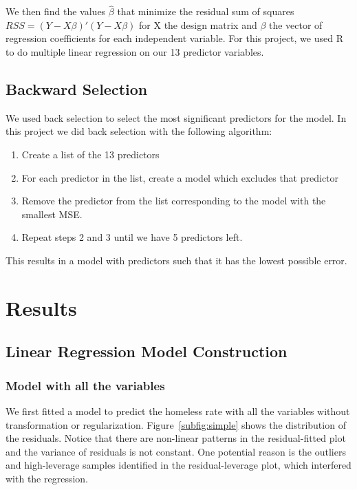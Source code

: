 \documentclass[12pt]{article}
\begin{document}
We then find the values $\hat{\beta}$ that minimize the residual sum of squares $RSS = (Y-X\beta)'(Y-X\beta)$ for X the design matrix and $\beta$ the vector of regression coefficients for each independent variable. For this project, we used R to do multiple linear regression on our 13 predictor variables.

\subsection{Backward Selection\cite{james_2023_an}}

We used back selection to select the most significant predictors for the model. In this project we did back selection with the following algorithm:
\begin{enumerate}
    \item Create a list of the 13 predictors
    \item For each predictor in the list, create a model which excludes that predictor
    \item Remove the predictor from the list corresponding to the model with the smallest MSE.
    \item Repeat steps 2 and 3 until we have 5 predictors left.
\end{enumerate}
This results in a model with predictors such that it has the lowest possible error.


\section{Results}
\subsection{Linear Regression Model Construction}

\subsubsection{Model with all the variables}
We first fitted a model to predict the homeless rate with all the variables without transformation or regularization. Figure~\ref{subfig:simple} shows the distribution of the residuals. Notice that there are non-linear patterns in the residual-fitted plot and the variance of residuals is not constant. One potential reason is the outliers and high-leverage samples identified in the residual-leverage plot, which interfered with the regression.
\end{document}
